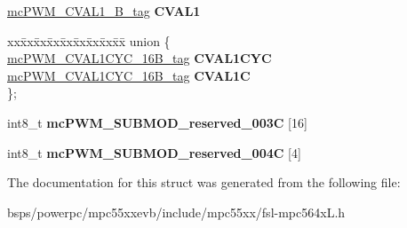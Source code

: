\begin{DoxyCompactItemize}
\begin{tabbing}
\end{tabbing}\item 
\mbox{\label{structmcPWM__SUBMOD__struct__tag_a467a75d59ae5efba163fac82d132d482}} 
\mbox{\hyperlink{unionmcPWM__CVAL1__16B__tag}{mc\+P\+W\+M\+\_\+\+C\+V\+A\+L1\+\_\+B\+\_\+tag}} {\bfseries C\+V\+A\+L1}
\item 
\mbox{\label{structmcPWM__SUBMOD__struct__tag_a25211a00834b15da6bb7ebf96a8446a2}} 
\begin{tabbing}
xx\=xx\=xx\=xx\=xx\=xx\=xx\=xx\=xx\=\kill
union \{\\
\>\mbox{\hyperlink{unionmcPWM__CVAL1CYC__16B__tag}{mcPWM\_CVAL1CYC\_16B\_tag}} {\bfseries CVAL1CYC}\\
\>\mbox{\hyperlink{unionmcPWM__CVAL1CYC__16B__tag}{mcPWM\_CVAL1CYC\_16B\_tag}} {\bfseries CVAL1C}\\
\}; \\

\end{tabbing}\item 
\mbox{\label{structmcPWM__SUBMOD__struct__tag_a66f9f22711e9df31cc0e500b9853a121}} 
int8\+\_\+t {\bfseries mc\+P\+W\+M\+\_\+\+S\+U\+B\+M\+O\+D\+\_\+reserved\+\_\+003C} \mbox{[}16\mbox{]}
\item 
\mbox{\label{structmcPWM__SUBMOD__struct__tag_a89bb4ea1ce10accffe3ac23ba69d78d0}} 
int8\+\_\+t {\bfseries mc\+P\+W\+M\+\_\+\+S\+U\+B\+M\+O\+D\+\_\+reserved\+\_\+004C} \mbox{[}4\mbox{]}
\end{DoxyCompactItemize}


The documentation for this struct was generated from the following file\+:\begin{DoxyCompactItemize}
\item 
bsps/powerpc/mpc55xxevb/include/mpc55xx/fsl-\/mpc564x\+L.\+h\end{DoxyCompactItemize}
